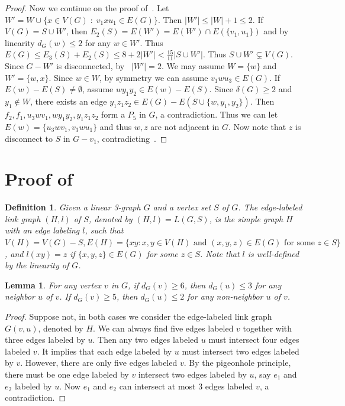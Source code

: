 \documentclass[a4paper]{article}
\newtheorem{lem}[thm]{Lemma}
\newtheorem{defi}[thm]{Definition}
\begin{document}
\begin{proof}
Now we continue on the proof of~.
Let $W'=W\cup \{x\in V(G)\;:\; v_1xu_1\in E(G)\}$. Then $|W'|\leq |W|+1\leq 2$. If $V(G)=S\cup W'$, then $E_2(S)=E(W')=E(W')\cap E(\{v_1,u_1\})$ and by linearity $d_G(w)\leq 2$ for any $w\in W'$. Thus $E(G)\leq E_3(S)+E_2(S)\leq 8+2|W'|<\frac{15}{11}|S\cup W'|$. Thus $S\cup W'\subsetneq V(G)$. Since $G-W'$ is disconnected, by~ $|W'|=2$. We may assume $W=\{w\}$ and $W'=\{w,x\}$. Since $w\in W$, by symmetry we can assume $v_1wu_3\in E(G)$.
If $E(w)-E(S)\neq \emptyset$, assume $wy_1y_2\in E(w)-E(S)$. Since $\delta(G)\geq 2$ and $y_1\notin W$, there exists an edge $y_1z_1z_2\in E(G)-E(S\cup \{w,y_1,y_2\})$. Then $f_2,f_1,u_3wv_1,wy_1y_2,y_1z_1z_2$ form a $P_5$ in $G$, a contradiction. Thus we can let $E(w)=\{u_3wv_1, v_3wu_1\}$ and thus $w,z$ are not adjacent in $G$. Now note that $z$ is disconnect to $S$ in $G-v_1$, contradicting~.
\end{proof}

\section{Proof of~}\label{Section4}

\begin{defi}
    Given a linear 3-graph $G$ and a vertex set $S$ of $G$. The edge-labeled link graph $(H,l)$ of $S$, denoted by $(H,l)=L(G,S)$, is the simple graph $H$ with an edge labeling $l$, such that $V(H)=V(G)-S,  E (H)=\{xy: x,y\in V(H) \mbox{ and }(x,y,z)\in E (G) \mbox{ for some } z\in S \}$, and $l(xy)=z$ if $\{x, y, z\} \in E (G)$ for some  $ z \in S $. Note that $l$ is well-defined by the linearity of $G$.
\end{defi}

\begin{lem}\label{lm8}
	For any vertex $v$ in $G$, if $d_G(v)\ge 6$, then $d_G(u)\le 3$ for any neighbor $u$ of $v$. If $d_G(v)\ge 5$, then $d_G(u)\le 2$ for any non-neighbor $u$ of $v$.
\end{lem}

\begin{proof}
	Suppose not, in both cases we consider the edge-labeled link graph $G(v,u)$, denoted by $H$. We can always find five edges labeled $v$ together with three edges labeled by $u$. Then any two edges labeled $u$ must intersect four edges labeled $v$. It implies that each edge labeled by $u$ must intersect two edges labeled by $v$. However, there are only five edges labeled $v$. By the pigeonhole principle, there must be one edge labeled by $v$ intersect two edges labeled by $u$, say $e_1$ and $e_2$ labeled by $u$. Now $e_1$ and $e_2$ can intersect at most 3 edges labeled $v$, a contradiction.
\end{proof}
\end{document}
